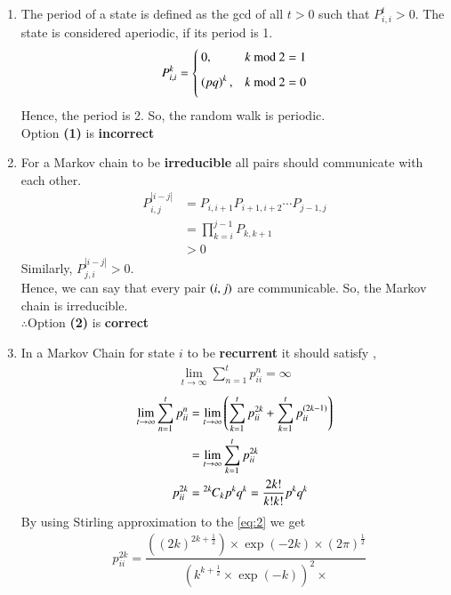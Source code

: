 \documentclass[journal,12pt,twocolumn]{IEEEtran}
\begin{document}
\begin{enumerate}
\item The period of a state is defined as the gcd of all $t > 0$ such that $P_{i,i}^{t} > 0$. The state is considered aperiodic, if its period is 1.
\begin{equation}
 P_{i,i}^{k} =\begin{cases}
  0 , &k\text{ mod }2 = 1\vspace{0.2cm}\\
  \brak{pq}^{k}, &k\text{ mod }2 = 0\vspace{0.2cm}\\
  \end{cases}
\end{equation}
Hence, the period is 2. So, the random walk is periodic.\\
Option \textbf{(1)} is \textbf{incorrect}
\item For a Markov chain to be \textbf{irreducible} all pairs  should communicate with each other. 
\begin{align}
P_{i,j}^{|i-j|} &= P_{i,i+1}P_{i+1,i+2}\cdots P_{j-1,j}\\
&= \prod_{k=i}^{j-1} P_{k,k+1}\\
&> 0
\end{align}
Similarly, $P_{j,i}^{|i-j|} > 0$.\\
Hence, we can say that every pair $\left(i,j\right)$ are communicable. So, the Markov chain is irreducible.\\
$\therefore$Option \textbf{(2)} is \textbf{correct}
\item In a Markov Chain for state $i$ to be \textbf{recurrent} it should satisfy ,
\begin{align}
\lim_{t \to \infty} \sum_{n=1}^{t} p^n_{ii} = \infty \label{eq:Recurrent}
\end{align}
\begin{align}
\lim_{t \to \infty} \sum_{n=1}^{t} p^n_{ii} &= \lim_{t \to \infty}\left(\sum_{k=1}^{t} p^{2k}_{ii} + \sum_{k=1}^{t} p^{(2k-1)}_{ii}\right)\\
&= \lim_{t \to \infty}\sum_{k=1}^{t} p^{2k}_{ii}\\
p^{2k}_{ii} &= {{}^{2k}\mkern-1muC_{k}}p^kq^k  = \frac{2k !}{k!k!}p^kq^k \label{eq:2}
\end{align}
By using Stirling approximation to the \eqref{eq:2} we get 
\begin{align}
&p^{2k}_{ii} = \dfrac{ \left((2k)^{2k+\frac{1}{2}}\right)\times \exp(-2k)\times(2\pi)^{\frac{1}{2}}}{\left(k^{k+\frac{1}{2}}\times \exp(-k)\right)^2\times
}
\end{align}
\end{enumerate}
\end{document}
